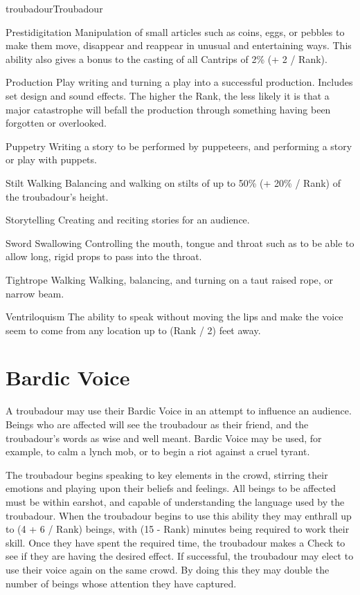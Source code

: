 \begin{Skill}[2.1]{troubadour}{Troubadour}
\begin{Description}
\item[Prestidigitation] Manipulation of small articles such as coins,
  eggs, or pebbles to make them move, disappear and reappear in
  unusual and entertaining ways. This ability also gives a bonus to
  the casting of all Cantrips of 2\% (+ 2 / Rank).

\item[Production] Play writing and turning a play into a successful
  production.  Includes set design and sound effects. The higher the
  Rank, the less likely it is that a major catastrophe will befall the
  production through something having been forgotten or overlooked.

\item[Puppetry] Writing a story to be performed by puppeteers, and
  performing a story or play with puppets.

\item[Stilt Walking] Balancing and walking on stilts of up to 50\% (+
  20\% / Rank) of the troubadour’s height.

\item[Storytelling] Creating and reciting stories for an audience.

\item[Sword Swallowing] Controlling the mouth, tongue and throat such
  as to be able to allow long, rigid props to pass into the throat.

\item[Tightrope] Walking Walking, balancing, and turning on a taut
  raised rope, or narrow beam.

\item[Ventriloquism] The ability to speak without moving the lips and
  make the voice seem to come from any location up to (Rank / 2) feet
  away.

\end{Description}

\section{Bardic Voice}

A troubadour may use their Bardic Voice in an attempt to influence an
audience.  Beings who are affected will see the troubadour as their
friend, and the troubadour’s words as wise and well meant.  Bardic
Voice may be used, for example, to calm a lynch mob, or to begin a
riot against a cruel tyrant.

The troubadour begins speaking to key elements in the crowd, stirring
their emotions and playing upon their beliefs and feelings. All beings
to be affected must be within earshot, and capable of understanding
the language used by the troubadour. When the troubadour begins to use
this ability they may enthrall up to (4 + 6 / Rank) beings, with (15 -
Rank) minutes being required to work their skill.  Once they have
spent the required time, the troubadour makes a Check to see if they
are having the desired effect.  If successful, the troubadour may
elect to use their voice again on the same crowd.  By doing this they
may double the number of beings whose attention they have captured.


\end{Skill}
